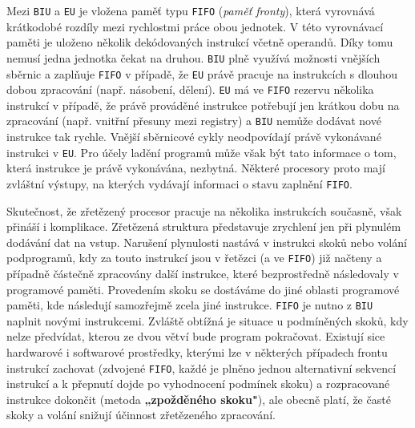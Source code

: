       Mezi \texttt{BIU} a \texttt{EU} je vložena paměť typu \texttt{FIFO} (\emph{paměť fronty}), 
      která vyrovnává krátkodobé rozdíly mezi rychlostmi práce obou jednotek. V této vyrovnávací 
      paměti je uloženo několik dekódovaných instrukcí včetně operandů. Díky tomu nemusí jedna 
      jednotka čekat na druhou. \texttt{BIU} plně využívá možnosti vnějších sběrnic a zaplňuje 
      \texttt{FIFO} v případě, že \texttt{EU} právě pracuje na instrukcích s dlouhou dobou 
      zpracování (např. násobení, dělení). \texttt{EU} má ve \texttt{FIFO} rezervu několika 
      instrukcí v případě, že právě prováděné instrukce potřebují jen krátkou dobu na zpracování 
      (např. vnitřní přesuny mezi registry) a \texttt{BIU} nemůže dodávat nové instrukce tak 
      rychle. Vnější sběrnicové cykly neodpovídají právě vykonávané instrukci v \texttt{EU}. Pro 
      účely ladění programů může však být tato informace o tom, která instrukce je právě 
      vykonávána, nezbytná. Některé procesory proto mají zvláštní výstupy, na kterých vydávají 
      informaci o stavu zaplnění \texttt{FIFO}.
      
      Skutečnost, že zřetězený procesor pracuje na několika instrukcích současně, však přináší i 
      komplikace. Zřetězená struktura představuje zrychlení jen při plynulém dodávání dat na vstup. 
      Narušení plynulosti nastává v instrukci skoků nebo volání podprogramů, kdy za touto instrukcí 
      jsou v řetězci (a ve \texttt{FIFO}) již načteny a případně částečně zpracovány další 
      instrukce, které bezprostředně následovaly v programové paměti. Provedením skoku se dostáváme 
      do jiné oblasti programové paměti, kde následují samozřejmě zcela jiné instrukce. 
      \texttt{FIFO} je nutno z \texttt{BIU} naplnit novými instrukcemi. Zvláště obtížná je situace 
      u podmíněných skoků, kdy nelze předvídat, kterou ze dvou větví bude program pokračovat. 
      Existují sice hardwarové i softwarové prostředky, kterými lze v některých případech frontu 
      instrukcí zachovat (zdvojené \texttt{FIFO}, každé je plněno jednou alternativní sekvencí 
      instrukcí a k přepnutí dojde po vyhodnocení podmínek skoku) a rozpracované instrukce dokončit 
      (metoda \textbf{„zpožděného skoku"}), ale obecně platí, že časté skoky a volání snižují 
      účinnost zřetězeného zpracování.
      
